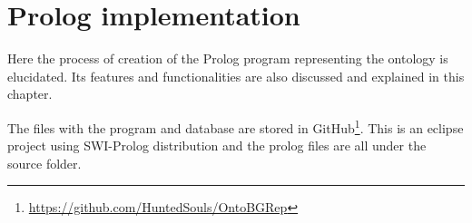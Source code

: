 \chapter{Prolog implementation}

Here the process of creation of the Prolog program representing the ontology is elucidated. Its features and functionalities are also discussed and explained in this chapter.

The files with the program and database are stored in GitHub\footnote{\url{https://github.com/HuntedSouls/OntoBGRep}}. This is an eclipse project using SWI-Prolog distribution and the prolog files are all under the source folder. 




